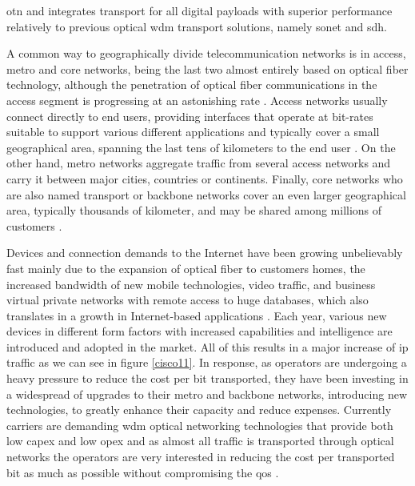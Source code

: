 \gls{otn} and integrates transport for all digital payloads with superior performance relatively to previous optical \gls{wdm} transport solutions, namely \gls{sonet} and \gls{sdh}.

 
\par A common way to geographically divide telecommunication networks is in access, metro and core networks, being the last two almost entirely based on optical fiber technology, although the penetration of optical fiber communications in the access segment is progressing at an astonishing rate \cite{F-T-H}. Access networks usually connect directly to end users, providing interfaces that operate at bit-rates suitable to support various different applications and typically cover a small geographical area, spanning the last tens of kilometers to the end user \cite{7127266}. On the other hand, metro networks aggregate traffic from several access networks and carry it between major cities, countries or continents. Finally, core networks who are also named transport or backbone networks cover an even larger geographical area, typically thousands of kilometer, and may be shared among millions of customers \cite{SimmonsJane2008}\cite{anpinto}. 
\par Devices and connection demands to the Internet have been growing unbelievably fast mainly due to the expansion of optical fiber to customers homes, the increased bandwidth of new mobile technologies, video traffic, and business virtual private networks with remote access to huge databases, which also translates in a growth in Internet-based applications \cite{SimmonsJane2008}\cite{TiagoEsteves}. Each year, various new devices in different form factors with increased capabilities and intelligence are introduced and adopted in the market. All of this results in a major increase  of \gls{ip} traffic as we can see in figure \ref{cisco11}. In response, as operators are undergoing a heavy pressure to reduce the cost per bit transported, they have been investing in a widespread of upgrades  to their metro and backbone networks, introducing new technologies, to greatly enhance their capacity and reduce expenses. Currently carriers are demanding \gls{wdm} optical networking technologies that provide both low \gls{capex} and low \gls{opex} and as almost all traffic is transported through optical networks the operators are very interested in reducing the cost per transported bit as much as possible without compromising the \gls{qos} \cite{SimmonsJane2008}.
\vspace{11pt}

